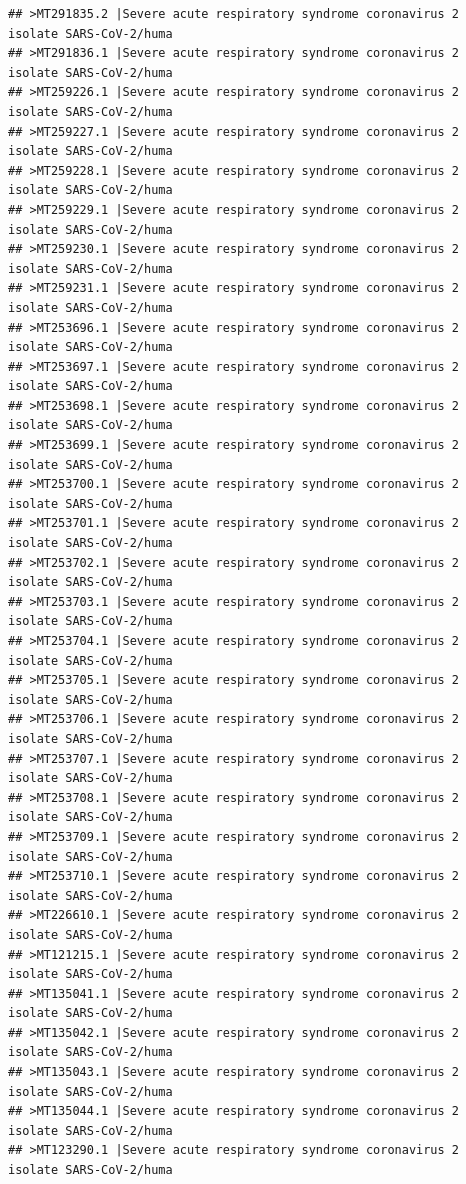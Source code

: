 \documentclass[
]{book}
\begin{document}
\begin{verbatim}
## >MT291835.2 |Severe acute respiratory syndrome coronavirus 2 isolate SARS-CoV-2/huma
## >MT291836.1 |Severe acute respiratory syndrome coronavirus 2 isolate SARS-CoV-2/huma
## >MT259226.1 |Severe acute respiratory syndrome coronavirus 2 isolate SARS-CoV-2/huma
## >MT259227.1 |Severe acute respiratory syndrome coronavirus 2 isolate SARS-CoV-2/huma
## >MT259228.1 |Severe acute respiratory syndrome coronavirus 2 isolate SARS-CoV-2/huma
## >MT259229.1 |Severe acute respiratory syndrome coronavirus 2 isolate SARS-CoV-2/huma
## >MT259230.1 |Severe acute respiratory syndrome coronavirus 2 isolate SARS-CoV-2/huma
## >MT259231.1 |Severe acute respiratory syndrome coronavirus 2 isolate SARS-CoV-2/huma
## >MT253696.1 |Severe acute respiratory syndrome coronavirus 2 isolate SARS-CoV-2/huma
## >MT253697.1 |Severe acute respiratory syndrome coronavirus 2 isolate SARS-CoV-2/huma
## >MT253698.1 |Severe acute respiratory syndrome coronavirus 2 isolate SARS-CoV-2/huma
## >MT253699.1 |Severe acute respiratory syndrome coronavirus 2 isolate SARS-CoV-2/huma
## >MT253700.1 |Severe acute respiratory syndrome coronavirus 2 isolate SARS-CoV-2/huma
## >MT253701.1 |Severe acute respiratory syndrome coronavirus 2 isolate SARS-CoV-2/huma
## >MT253702.1 |Severe acute respiratory syndrome coronavirus 2 isolate SARS-CoV-2/huma
## >MT253703.1 |Severe acute respiratory syndrome coronavirus 2 isolate SARS-CoV-2/huma
## >MT253704.1 |Severe acute respiratory syndrome coronavirus 2 isolate SARS-CoV-2/huma
## >MT253705.1 |Severe acute respiratory syndrome coronavirus 2 isolate SARS-CoV-2/huma
## >MT253706.1 |Severe acute respiratory syndrome coronavirus 2 isolate SARS-CoV-2/huma
## >MT253707.1 |Severe acute respiratory syndrome coronavirus 2 isolate SARS-CoV-2/huma
## >MT253708.1 |Severe acute respiratory syndrome coronavirus 2 isolate SARS-CoV-2/huma
## >MT253709.1 |Severe acute respiratory syndrome coronavirus 2 isolate SARS-CoV-2/huma
## >MT253710.1 |Severe acute respiratory syndrome coronavirus 2 isolate SARS-CoV-2/huma
## >MT226610.1 |Severe acute respiratory syndrome coronavirus 2 isolate SARS-CoV-2/huma
## >MT121215.1 |Severe acute respiratory syndrome coronavirus 2 isolate SARS-CoV-2/huma
## >MT135041.1 |Severe acute respiratory syndrome coronavirus 2 isolate SARS-CoV-2/huma
## >MT135042.1 |Severe acute respiratory syndrome coronavirus 2 isolate SARS-CoV-2/huma
## >MT135043.1 |Severe acute respiratory syndrome coronavirus 2 isolate SARS-CoV-2/huma
## >MT135044.1 |Severe acute respiratory syndrome coronavirus 2 isolate SARS-CoV-2/huma
## >MT123290.1 |Severe acute respiratory syndrome coronavirus 2 isolate SARS-CoV-2/huma

\end{verbatim}
\end{document}

